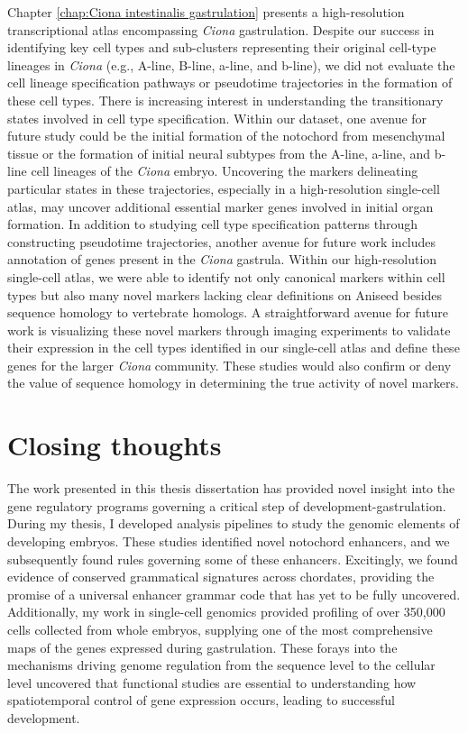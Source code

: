 \begin{dissertationepilogue}
    Chapter \ref{chap:Ciona intestinalis gastrulation} presents a high-resolution transcriptional atlas encompassing \textit{Ciona} gastrulation. Despite our success in identifying key cell types and sub-clusters representing their original cell-type lineages in \textit{Ciona} (e.g., A-line, B-line, a-line, and b-line), we did not evaluate the cell lineage specification pathways or pseudotime trajectories in the formation of these cell types. There is increasing interest in understanding the transitionary states involved in cell type specification. Within our dataset, one avenue for future study could be the initial formation of the notochord from mesenchymal tissue or the formation of initial neural subtypes from the A-line, a-line, and b-line cell lineages of the \textit{Ciona} embryo. Uncovering the markers delineating particular states in these trajectories, especially in a high-resolution single-cell atlas, may uncover additional essential marker genes involved in initial organ formation. In addition to studying cell type specification patterns through constructing pseudotime trajectories, another avenue for future work includes annotation of genes present in the \textit{Ciona} gastrula. Within our high-resolution single-cell atlas, we were able to identify not only canonical markers within cell types but also many novel markers lacking clear definitions on Aniseed besides sequence homology to vertebrate homologs. A straightforward avenue for future work is visualizing these novel markers through imaging experiments to validate their expression in the cell types identified in our single-cell atlas and define these genes for the larger \textit{Ciona} community. These studies would also confirm or deny the value of sequence homology in determining the true activity of novel markers.

    \section{Closing thoughts}
    The work presented in this thesis dissertation has provided novel insight into the gene regulatory programs governing a critical step of development-gastrulation. During my thesis, I developed analysis pipelines to study the genomic elements of developing embryos. These studies identified novel notochord enhancers, and we subsequently found rules governing some of these enhancers. Excitingly, we found evidence of conserved grammatical signatures across chordates, providing the promise of a universal enhancer grammar code that has yet to be fully uncovered. Additionally, my work in single-cell genomics provided profiling of over 350,000 cells collected from whole embryos, supplying one of the most comprehensive maps of the genes expressed during gastrulation. These forays into the mechanisms driving genome regulation from the sequence level to the cellular level uncovered that functional studies are essential to understanding how spatiotemporal control of gene expression occurs, leading to successful development. 
    

\end{dissertationepilogue}
